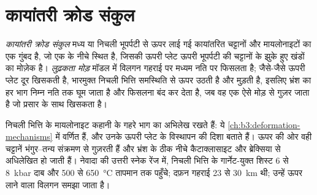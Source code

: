 \section{कायांतरी क्रोड संकुल}\label{sec:b3:extension-strike-slip:core}

\begin{definition}[कायांतरी क्रोड संकुल, लुढ़कता मोड़]\label{def:b3:extension-strike-slip:core-complex}
\emph{कायांतरी क्रोड संकुल} मध्य या निचली भूपर्पटी से ऊपर लाई गई
कायांतरित चट्टानों और मायलोनाइटों का एक गुंबद है, जो एक  के नीचे स्थित है,
जिसकी ऊपरी प्लेट ऊपरी भूपर्पटी की चट्टानों के झुके हुए खंडों का मोज़ेक है।
\emph{लुढ़कता मोड़} मॉडल में विलगन गहराई पर मध्यम नति पर फिसलता है; जैसे-जैसे ऊपरी प्लेट दूर खिसकती है,
भारमुक्त निचली भित्ति समस्थिति से ऊपर उठती है और मुड़ती है, इसलिए
भ्रंश का हर भाग निम्न नति तक घूम जाता है और फिसलना बंद कर देता है,
जब वह एक ऐसे मोड़ से गुज़र जाता है
जो प्रसार के साथ खिसकता है।
\end{definition}

निचली भित्ति के मायलोनाइट कहानी के गहरे भाग का अभिलेख रखते हैं: ये
\cref{ch:b3:deformation-mechanisms} में वर्णित  हैं, और उनके
 ऊपरी प्लेट के विस्थापन की दिशा बताते हैं। ऊपर की ओर वही
चट्टानें भंगुर--तन्य संक्रमण से गुज़रती हैं और भ्रंश के ठीक नीचे
कैटाक्लासाइट और ब्रेक्सिया से अधिलेखित हो जाती हैं। नेवादा की उत्तरी स्नेक रेंज में,
निचली भित्ति के गार्नेट-युक्त शिस्ट 6 से \qty{8}{kbar} दाब और
500 से \qty{650}{\celsius} तापमान तक पहुँचे; दफ़न गहराई 23 से \qty{30}{km} थी;
उन्हें ऊपर लाने वाला विलगन  समझा जाता है।

